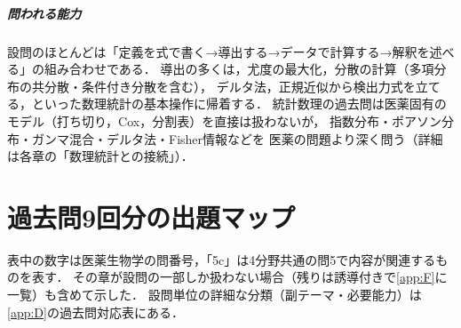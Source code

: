 \enlargethispage{4\baselineskip}
\paragraph{問われる能力}
設問のほとんどは「定義を式で書く→導出する→データで計算する→解釈を述べる」の組み合わせである．
導出の多くは，尤度の最大化，分散の計算（多項分布の共分散・条件付き分散を含む），
デルタ法，正規近似から検出力式を立てる，といった数理統計の基本操作に帰着する．
統計数理の過去問は医薬固有のモデル（打ち切り，Cox，分割表）を直接は扱わないが，
指数分布・ポアソン分布・ガンマ混合・デルタ法・Fisher情報などを
医薬の問題より深く問う（詳細は各章の「数理統計との接続」）．

\chapter*{過去問9回分の出題マップ}

表中の数字は医薬生物学の問番号，「5c」は4分野共通の問5で内容が関連するものを表す．
その章が設問の一部しか扱わない場合（残りは誘導付きで\cref{app:F}に一覧）も含めて示した．
設問単位の詳細な分類（副テーマ・必要能力）は\cref{app:D}の過去問対応表にある．


